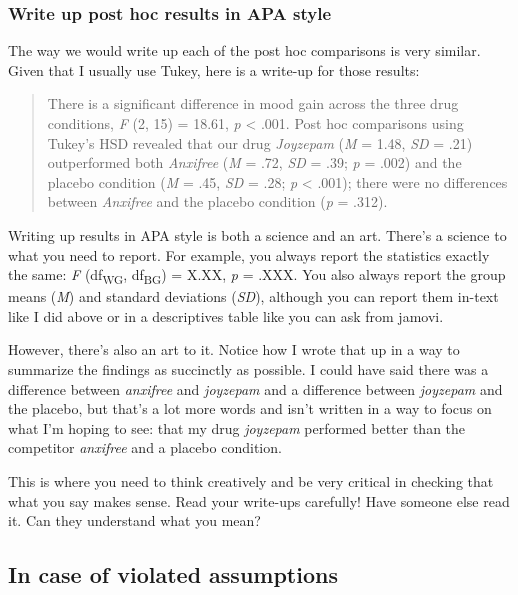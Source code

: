 \documentclass[
]{book}
\begin{document}
\hypertarget{write-up-post-hoc-results-in-apa-style}{%
\subsubsection{Write up post hoc results in APA style}\label{write-up-post-hoc-results-in-apa-style}}

The way we would write up each of the post hoc comparisons is very similar. Given that I usually use Tukey, here is a write-up for those results:

\begin{quote}
There is a significant difference in mood gain across the three drug conditions, \emph{F} (2, 15) = 18.61, \emph{p} \textless{} .001. Post hoc comparisons using Tukey's HSD revealed that our drug \emph{Joyzepam} (\emph{M} = 1.48, \emph{SD} = .21) outperformed both \emph{Anxifree} (\emph{M} = .72, \emph{SD} = .39; \emph{p} = .002) and the placebo condition (\emph{M} = .45, \emph{SD} = .28; \emph{p} \textless{} .001); there were no differences between \emph{Anxifree} and the placebo condition (\emph{p} = .312).
\end{quote}

Writing up results in APA style is both a science and an art. There's a science to what you need to report. For example, you always report the statistics exactly the same: \emph{F} (df\textsubscript{WG}, df\textsubscript{BG}) = X.XX, \emph{p} = .XXX. You also always report the group means (\emph{M}) and standard deviations (\emph{SD}), although you can report them in-text like I did above or in a descriptives table like you can ask from jamovi.

However, there's also an art to it. Notice how I wrote that up in a way to summarize the findings as succinctly as possible. I could have said there was a difference between \emph{anxifree} and \emph{joyzepam} and a difference between \emph{joyzepam} and the placebo, but that's a lot more words and isn't written in a way to focus on what I'm hoping to see: that my drug \emph{joyzepam} performed better than the competitor \emph{anxifree} and a placebo condition.

This is where you need to think creatively and be very critical in checking that what you say makes sense. Read your write-ups carefully! Have someone else read it. Can they understand what you mean?

\hypertarget{in-case-of-violated-assumptions-5}{%
\subsection{In case of violated assumptions}\label{in-case-of-violated-assumptions-5}}
\end{document}
